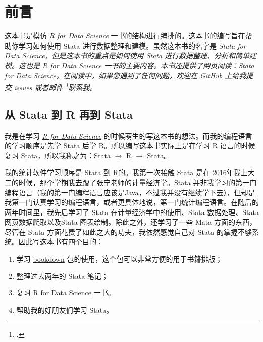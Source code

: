 \chapter{前言}

这本书是模仿 \href{https://r4ds.had.co.nz/}{\it{R for Data Science}} 一书的结构进行编排的。这本书的编写旨在帮助你学习如何使用 Stata 进行数据整理和建模。虽然这本书的名字是 \it{Stata for Data Science}，但是这本书的重点是如何使用 Stata 进行数据整理、分析和简单建模。这也是 \href{https://r4ds.had.co.nz/}{\it{R for Data Science}} 一书的主要内容。本书还提供了网页阅读：\href{https://www.czxa.top/stata4ds/book/}{Stata for Data Science}。在阅读中，如果您遇到了任何问题，欢迎在 \href{https://github.com/czxa/stata4ds}{GitHub} 上给我提交 \href{https://github.com/czxa/stata4ds/issues}{issues} 或者邮件 \footnote{.}联系我。

\section{从 Stata 到 R 再到 Stata}

我是在学习  \href{https://r4ds.had.co.nz/}{\it{R for Data Science}}  的时候萌生的写这本书的想法。而我的编程语言的学习顺序是先学 Stata 后学 R。所以编写这本书实际上是在学习 R 语言的时候复习 Stata，所以我称之为：\textcolor{third3}{Stata $\rightarrow$ R  $\rightarrow$ Stata}。

我的统计软件学习顺序是 Stata 到 R的。我第一次接触 \href{https://www.stata.com/}{Stata} 是在 2016年我上大二的时候，那个学期我去蹭了\href{https://ec.jnu.edu.cn/news/view/id/4156}{张宁老师}的计量经济学。Stata 并非我学习的第一门编程语言（我的第一门编程语言应该是Java，不过我并没有继续学下去），但却是我第一门认真学习的编程语言，或者更具体地说，第一门统计编程语言。在随后的两年时间里，我先后学习了 Stata 在计量经济学中的使用、Stata 数据处理、Stata 网页数据爬取以及Stata 图表绘制。除此之外，还学习了一些 Mata 方面的东西，尽管在 Stata 方面花费了如此之大的功夫，我依然感觉自己对 Stata 的掌握不够系统。因此写这本书有四个目的：

\begin{enumerate}
 \item 学习 \href{https://bookdown.org/}{bookdown} 包的使用，这个包可以非常方便的用于书籍排版；
 \item 整理过去两年的 Stata 笔记；
 \item 复习 \href{https://r4ds.had.co.nz/}{R for Data Science} 一书。
 \item 帮助我的好朋友们学习 Stata。
\end{enumerate}


